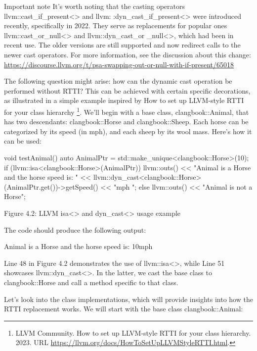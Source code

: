 \begin{myNotic}{Important note}
It's worth noting that the casting operators llvm::cast\_if\_present<> and llvm: :dyn\_cast\_if\_present<> were introduced recently, specifically in 2022. They serve as replacements for popular ones llvm::cast\_or\_null<> and llvm::dyn\_cast\_or \_null<>, which had been in recent use. The older versions are still supported and now redirect calls to the newer cast operators. For more information, see the discussion about this change: \url{https://discourse.llvm.org/t/psa-swapping-out-or-null-with-if-present/65018}
\end{myNotic}

The following question might arise: how can the dynamic cast operation be performed without RTTI? This can be achieved with certain specific decorations, as illustrated in a simple example inspired by How to set up LLVM-style RTTI for your class hierarchy \footnote{LLVM Community. How to set up LLVM-style RTTI for your class hierarchy. 2023. URL \url{https://llvm.org/docs/HowToSetUpLLVMStyleRTTI.html}.}. We'll begin with a base class, clangbook::Animal, that has two descendants: clangbook::Horse and clangbook::Sheep. Each horse can be categorized by its speed (in mph), and each sheep by its wool mass. Here's how it can be used:

\begin{cpp}
void testAnimal() {
  auto AnimalPtr = std::make_unique<clangbook::Horse>(10);
  if (llvm::isa<clangbook::Horse>(AnimalPtr)) {
    llvm::outs()
      << "Animal is a Horse and the horse speed is: "
      << llvm::dyn_cast<clangbook::Horse>(AnimalPtr.get())->getSpeed()
      << "mph \n";
  } else {
    llvm::outs() << "Animal is not a Horse\n";
  }
}
\end{cpp}

\begin{center}
Figure 4.2: LLVM isa<> and dyn\_cast<> usage example
\end{center}

The code should produce the following output:

\begin{shell}
Animal is a Horse and the horse speed is: 10mph
\end{shell}

Line 48 in Figure 4.2 demonstrates the use of llvm::isa<>, while Line 51 showcases llvm::dyn\_cast<>. In the latter, we cast the base class to clangbook::Horse and call a method specific to that class.

Let's look into the class implementations, which will provide insights into how the RTTI replacement works. We will start with the base class clangbook::Animal:

